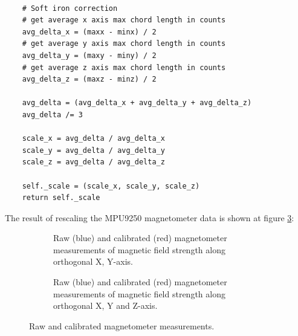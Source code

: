 \lstset{language=Python}
\begin{lstlisting}[frame=single]  % Start your code-block

    # Soft iron correction
    # get average x axis max chord length in counts
    avg_delta_x = (maxx - minx) / 2
    # get average y axis max chord length in counts
    avg_delta_y = (maxy - miny) / 2
    # get average z axis max chord length in counts
    avg_delta_z = (maxz - minz) / 2

    avg_delta = (avg_delta_x + avg_delta_y + avg_delta_z)
    avg_delta /= 3

    scale_x = avg_delta / avg_delta_x
    scale_y = avg_delta / avg_delta_y
    scale_z = avg_delta / avg_delta_z

    self._scale = (scale_x, scale_y, scale_z)
    return self._scale

\end{lstlisting}

The result of rescaling the MPU9250 magnetometer data is shown at figure \ref{fig:mag_calibration_output}:

\begin{figure}[H]
    \centering
    \begin{subfigure}{0.7\textwidth}
        \centering
        \resizebox{1\linewidth}{!}{}
        \caption{Raw (blue) and calibrated (red) magnetometer measurements of magnetic field strength along orthogonal X, Y-axis.}
        \label{fig:magnetometer_calibrated2D}
    \end{subfigure}

    \begin{subfigure}{0.7\textwidth}
        \centering
        \resizebox{1\linewidth}{!}{}
        \caption{Raw (blue) and calibrated (red) magnetometer measurements of magnetic field strength along orthogonal X, Y and Z-axis.}
        \label{fig:magnetometer_calibrated3D}
    \end{subfigure}
    \caption{Raw and calibrated magnetometer measurements.}
    \label{fig:mag_calibration_output}
\end{figure}

\newpage



